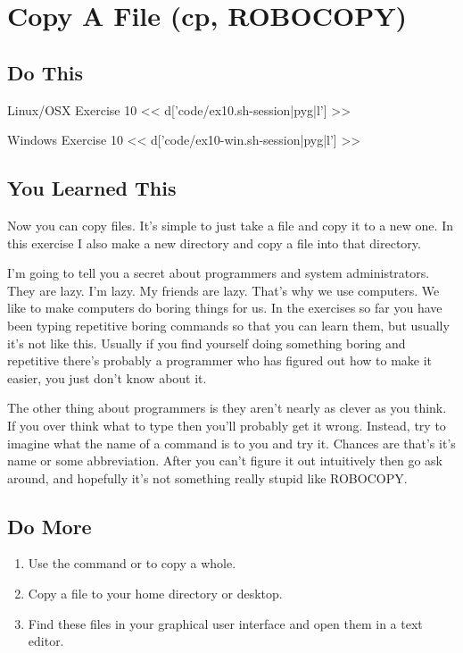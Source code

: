 \chapter{Copy A File (cp, ROBOCOPY)}

\section{Do This}

\begin{code}{Linux/OSX Exercise 10}
<< d['code/ex10.sh-session|pyg|l'] >>
\end{code}

\begin{code}{Windows Exercise 10}
<< d['code/ex10-win.sh-session|pyg|l'] >>
\end{code}

\section{You Learned This}

Now you can copy files.  It's simple to just take a file and copy it to a new
one.  In this exercise I also make a new directory and copy a file into that
directory.

I'm going to tell you a secret about programmers and system administrators.
They are lazy.  I'm lazy.  My friends are lazy.  That's why we use computers.
We like to make computers do boring things for us.  In the exercises so far
you have been typing repetitive boring commands so that you can learn them,
but usually it's not like this.  Usually if you find yourself doing something
boring and repetitive there's probably a programmer who has figured out
how to make it easier, you just don't know about it.

The other thing about programmers is they aren't nearly as clever as you
think.  If you over think what to type then you'll probably get it wrong.
Instead, try to imagine what the name of a command is to you and try it.
Chances are that's it's name or some abbreviation.  After you can't figure
it out intuitively then go ask around, and hopefully it's not something
really stupid like ROBOCOPY.


\section{Do More}

\begin{enumerate}
\item Use the  command or  to copy a
    whole.
\item Copy a file to your home directory or desktop.
\item Find these files in your graphical user interface and open them
    in a text editor.
\end{enumerate}

